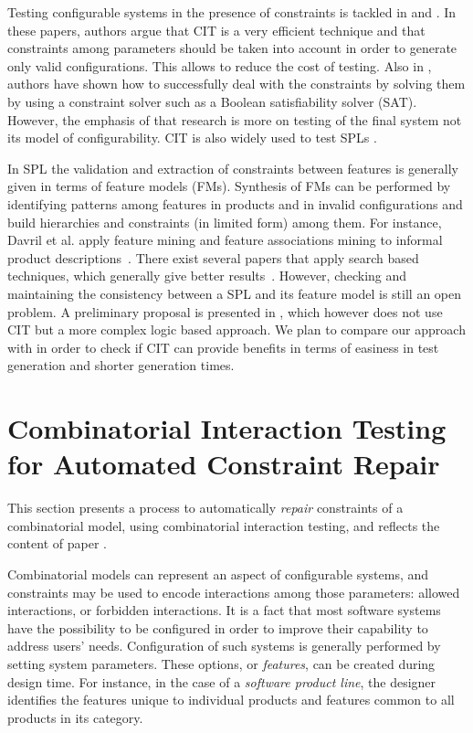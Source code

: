 \begin{tikzborder}{\cite{Gargantini16:validation}}
Testing configurable systems in the presence of constraints is tackled in \cite{CohenTSE08} and \cite{Petke15:practical}. In these papers, authors argue that CIT is a very efficient technique and that constraints among parameters should be taken into account in order to generate only valid configurations. This allows to reduce the cost of testing. Also in \cite{jar10}, authors have shown how to successfully deal with the constraints by solving them by using a constraint solver such as a Boolean satisfiability solver (SAT). However, the emphasis of that research is more on testing of the final system not its model of configurability. CIT is also widely used to test SPLs \cite{Perrouin010a}.

In SPL the validation and extraction of constraints between features is generally  given in terms of feature models (FMs). Synthesis of FMs can be performed by identifying patterns among features in products and in invalid configurations and build hierarchies and constraints (in limited form) among them. For instance, Davril et al. apply feature mining and feature associations mining to informal product descriptions~\cite{Davril13}. There exist several papers that apply search based techniques, which generally give better results~\cite{SBSEforSPLsurvey,LopezHerrejon201533,FerreiraVQ13,lopez-herrejon_reverse_2012}. However, checking and maintaining the consistency between a SPL and its feature model is still an open problem. A preliminary proposal is presented in \cite{icst2016}, which however does not use CIT but a more complex logic based approach. We plan to compare our approach with \cite{icst2016} in order to check if CIT can provide benefits in terms of easiness in test generation and shorter  generation times.\be


\section{Combinatorial Interaction Testing for Automated Constraint Repair}\label{sec:gargantini_combinatorial_2017}


This section presents a process to automatically \textit{repair} constraints of a combinatorial model, using combinatorial interaction testing, and reflects the content of paper \cite{gargantini_combinatorial_2017}.

Combinatorial models can represent an aspect of configurable systems, and constraints may be used to encode interactions among those parameters: allowed interactions, or forbidden interactions.
It is a fact that most software systems have the possibility to be configured in order to improve their capability to address users' needs. Configuration of such systems is generally performed by setting system parameters. These options, or \emph{features}, can be created during design time. For instance, in the case of a \emph{software product line}, the designer identifies the features unique to individual products and features common to all products in its category.


\end{tikzborder}
